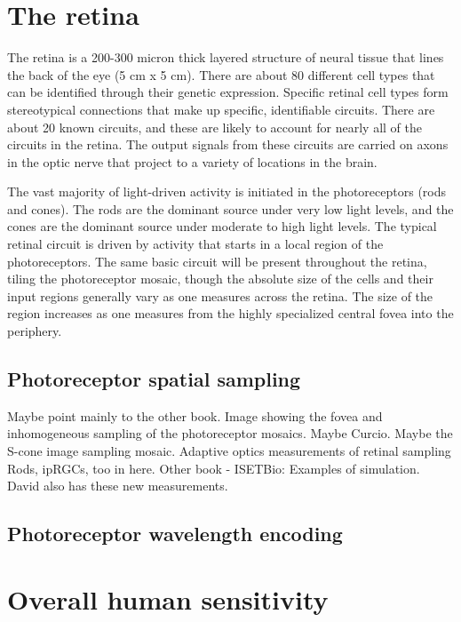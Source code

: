 \documentclass[
  letterpaper,
]{book}
\begin{document}
\section{The retina}\label{the-retina}

The retina is a 200-300 micron thick layered structure of neural tissue
that lines the back of the eye (5 cm x 5 cm). There are about 80
different cell types that can be identified through their genetic
expression. Specific retinal cell types form stereotypical connections
that make up specific, identifiable circuits. There are about 20 known
circuits, and these are likely to account for nearly all of the circuits
in the retina. The output signals from these circuits are carried on
axons in the optic nerve that project to a variety of locations in the
brain.

The vast majority of light-driven activity is initiated in the
photoreceptors (rods and cones). The rods are the dominant source under
very low light levels, and the cones are the dominant source under
moderate to high light levels. The typical retinal circuit is driven by
activity that starts in a local region of the photoreceptors. The same
basic circuit will be present throughout the retina, tiling the
photoreceptor mosaic, though the absolute size of the cells and their
input regions generally vary as one measures across the retina. The size
of the region increases as one measures from the highly specialized
central fovea into the periphery.

\subsection{Photoreceptor spatial
sampling}\label{photoreceptor-spatial-sampling}

Maybe point mainly to the other book. Image showing the fovea and
inhomogeneous sampling of the photoreceptor mosaics. Maybe Curcio. Maybe
the S-cone image sampling mosaic. Adaptive optics measurements of
retinal sampling Rods, ipRGCs, too in here. Other book - ISETBio:
Examples of simulation. David also has these new measurements.

\subsection{Photoreceptor wavelength
encoding}\label{photoreceptor-wavelength-encoding}

\section{Overall human sensitivity}\label{overall-human-sensitivity}
\end{document}
